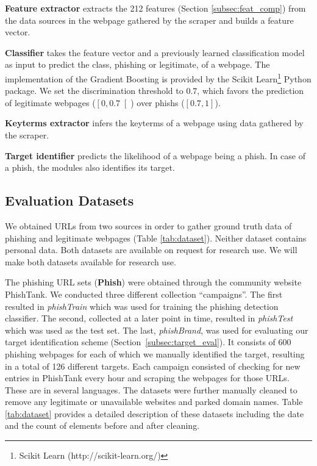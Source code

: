 \documentclass[10pt,conference,compsocconf,letterpaper]{IEEEtran}
\begin{document}
\noindent\textbf{Feature extractor} extracts the 212 features (Section \ref{subsec:feat_comp}) from the data sources in the webpage
\iffullversion
gathered by the scraper 
\fi
and builds a feature vector.

\noindent\textbf{Classifier} takes the feature vector and a previously learned classification model as input to predict the class, phishing or legitimate, of a webpage. The implementation of the Gradient Boosting is provided by the Scikit Learn\footnote{Scikit Learn (http://scikit-learn.org/)} Python package. 
\iffeateval
We set the discrimination threshold to $0.7$, which favors the prediction of legitimate webpages ($ \left[0, 0.7 \right[ $) over phishs ($ \left[0.7, 1 \right] $).
\fi

\noindent\textbf{Keyterms extractor} infers the keyterms of a webpage using data gathered by the scraper.

\noindent\textbf{Target identifier} predicts the likelihood of a webpage being a phish. In case of a phish, the modules also identifies its target.

\subsection{Evaluation Datasets}

We obtained URLs from two sources in order to gather ground truth data of phishing and legitimate webpages (Table \ref{tab:dataset}). 
Neither dataset contains personal data. 
\iffullversion
Both datasets are available on request for research use.
\else
We will make both datasets available for research use.
\fi


The phishing URL sets (\textbf{Phish}) were obtained through the community website PhishTank. We conducted three different collection ``campaigns''. The first resulted in \textit{phishTrain} which was used for training the phishing detection classifier. The second, collected at a later point in time, resulted in \textit{phishTest} which was used as the test set. The last, \textit{phishBrand}, was used for evaluating our target identification scheme (Section~\ref{subsec:target_eval}). It consists of 600 phishing webpages for each of which we manually identified the target, resulting in a total of 126 different targets. Each campaign consisted of checking for new entries in PhishTank every hour and scraping the webpages for those URLs.
These are in several languages. The datasets were further manually cleaned to remove any legitimate or unavailable websites and parked domain names. Table \ref{tab:dataset} provides a detailed description of these datasets including the date and the count of elements before and after cleaning.
\end{document}
